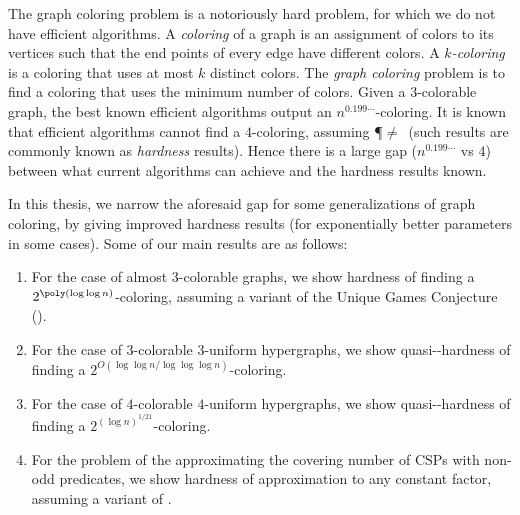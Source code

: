 
The graph coloring problem is a notoriously hard problem, for which we do not
have efficient algorithms. A \emph{coloring} of a graph is an assignment of colors
to its vertices such that the end points of every edge have different
colors. A $k$\emph{-coloring} is a coloring that uses at most $k$ distinct colors.
The \emph{graph coloring} problem is to find a coloring that uses the
minimum number of colors. Given a $3$-colorable graph, the best known efficient
algorithms output an $n^{0.199\cdots}$-coloring. It is known that efficient
algorithms cannot find a $4$-coloring, assuming \P$\neq$\NP\ (such results are commonly known as \emph{hardness}
results). Hence there is a large gap
($n^{0.199\cdots}$ vs $4$) between what current algorithms can achieve and the
hardness results known.

In this thesis, we narrow the aforesaid gap for some generalizations of graph coloring, 
by giving improved hardness results (for exponentially better parameters in some cases). 
Some of our main results are as follows:

\begin{enumerate}

\item For the case of almost $3$-colorable graphs, we show hardness of finding
a $2^{\poly(\log \log n)}$-coloring, assuming a variant of the Unique Games
Conjecture (\UGC).

\item For the case of $3$-colorable $3$-uniform hypergraphs, we show 
quasi-\NP-hardness of finding a $2^{O(\log \log n/ \log \log \log n)}$-coloring.

\item For the case of $4$-colorable $4$-uniform hypergraphs, we show 
quasi-\NP-hardness of finding a $2^{(\log n)^{1/21}}$-coloring.

\item For the problem of the approximating the covering number of CSPs with
non-odd predicates, we show hardness of approximation to any constant factor,
assuming a variant of \UGC.

\end{enumerate}
